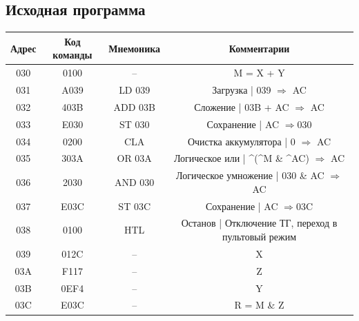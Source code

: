 \documentclass[12pt,onecolumn]{article}
\begin{document}
\begin{flushleft}
\section{Исходная программа}
\hfill \break
\FloatBarrier
\begingroup
    \fontsize{12pt}{7pt}\selectfont
\begin{longtable}[c]{@{}|c|c|c|c|@{}}
  \toprule
  \textbf{Адрес} & \textbf{Код команды} & \textbf{Мнемоника} & \textbf{Комментарии}                                                                              \\* \midrule
  \endfirsthead
  \endhead 
  030 & 0100 & --      & M = X + Y                                          \\* \midrule
  031 & A039 & LD 039  & Загрузка | 039 $\Rightarrow$ AC                    \\* \midrule
  032 & 403B & ADD 03B & Сложение | 03B + AC $\Rightarrow$ AC               \\* \midrule
  033 & E030 & ST 030  & Сохранение | AC $\Rightarrow$030                   \\* \midrule
  034 & 0200 & CLA     & Очистка аккумулятора | 0 $\Rightarrow$ AC          \\* \midrule
  035            & 303A                 & OR 03A             & Логическое или | \textasciicircum{}(\textasciicircum{}M \& \textasciicircum{}AC) $\Rightarrow$ AC \\* \midrule
  036 & 2030 & AND 030 & Логическое умножение | 030 \& AC $\Rightarrow$ AC  \\* \midrule
  037 & E03C & ST 03C  & Сохранение | AC $\Rightarrow$03C                   \\* \midrule
  038 & 0100 & HTL     & Останов | Отключение ТГ, переход в пультовый режим \\* \midrule
  039 & 012C & --      & X                                                  \\* \midrule
  03A & F117 & --      & Z                                                  \\* \midrule
  03B & 0EF4 & --      & Y                                                  \\* \midrule
  03C & E03C & --      & R = M \& Z                                         \\* \bottomrule
\end{longtable}
\endgroup
\begingroup  \fontsize{8pt}{12pt}\selectfont

\end{flushleft}
\end{document}
